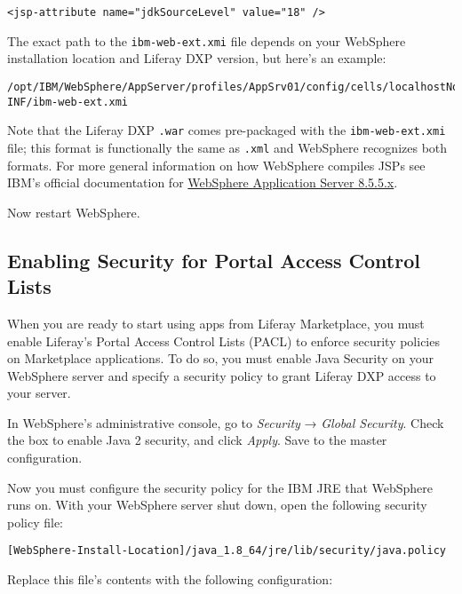 \begin{verbatim}
<jsp-attribute name="jdkSourceLevel" value="18" />
\end{verbatim}

The exact path to the \texttt{ibm-web-ext.xmi} file depends on your
WebSphere installation location and Liferay DXP version, but here's an
example:

\begin{verbatim}
/opt/IBM/WebSphere/AppServer/profiles/AppSrv01/config/cells/localhostNode01Cell/applications/liferayXX.ear/deployments/liferayXX/liferayXX.war/WEB-INF/ibm-web-ext.xmi
\end{verbatim}

Note that the Liferay DXP \texttt{.war} comes pre-packaged with the
\texttt{ibm-web-ext.xmi} file; this format is functionally the same as
\texttt{.xml} and WebSphere recognizes both formats. For more general
information on how WebSphere compiles JSPs see IBM's official
documentation for
\href{https://www.ibm.com/support/knowledgecenter/en/SSAW57_8.5.5/com.ibm.websphere.nd.doc/ae/rweb_jspengine.html}{WebSphere
Application Server 8.5.5.x}.

Now restart WebSphere.

\subsection{Enabling Security for Portal Access Control
Lists}\label{enabling-security-for-portal-access-control-lists}

When you are ready to start using apps from Liferay Marketplace, you
must enable Liferay's Portal Access Control Lists (PACL) to enforce
security policies on Marketplace applications. To do so, you must enable
Java Security on your WebSphere server and specify a security policy to
grant Liferay DXP access to your server.

In WebSphere's administrative console, go to \emph{Security} →
\emph{Global Security}. Check the box to enable Java 2 security, and
click \emph{Apply}. Save to the master configuration.

Now you must configure the security policy for the IBM JRE that
WebSphere runs on. With your WebSphere server shut down, open the
following security policy file:

\begin{verbatim}
[WebSphere-Install-Location]/java_1.8_64/jre/lib/security/java.policy
\end{verbatim}

Replace this file's contents with the following configuration:

